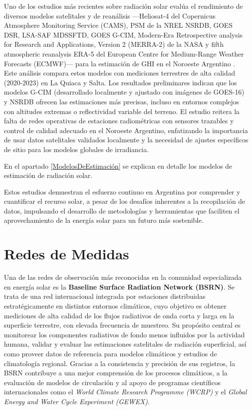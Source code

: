 Uno de los estudios más recientes sobre radiación solar evalúa el rendimiento de diversos modelos satelitales y de reanálisis —Heliosat-4 \citep{qu2017} del Copernicus Atmosphere Monitoring Service (CAMS), PSM de la NREL NSRDB, GOES DSR, LSA-SAF MDSSFTD, GOES G-CIM, Modern-Era Retrospective analysis for Research and Applications, Version 2 (MERRA-2) de la NASA y fifth atmospheric reanalysis ERA-5 del European Centre for Medium-Range Weather Forecasts (ECMWF)— para la estimación de GHI en el Noroeste Argentino \cite{Ledesma2025}. Este análisis compara estos modelos con mediciones terrestres de alta calidad (2020-2023) en La Quiaca y Salta. Los resultados preliminares indican que los modelos G-CIM (desarrollado localmente y ajustado con imágenes de GOES-16) y NSRDB ofrecen las estimaciones más precisas, incluso en entornos complejos con altitudes extremas o reflectividad variable del terreno. El estudio reitera la falta de redes operativas de estaciones radiométricas con sensores trazables y control de calidad adecuado en el Noroeste Argentino, enfatizando la importancia de usar datos satelitales validados localmente y la necesidad de ajustes específicos de sitio para los modelos globales de irradiancia.

En el apartado \ref{ModelosDeEstimación} se explican en detalle los modelos de estimación de radiación solar.

Estos estudios demuestran el esfuerzo continuo en Argentina por comprender y cuantificar el recurso solar, a pesar de los desafíos inherentes a la recopilación de datos, impulsando el desarrollo de metodologías y herramientas que faciliten el aprovechamiento de la energía solar para un futuro más sostenible.

\section{Redes de Medidas}

Una de las redes de observación más reconocidas en la comunidad especializada en energía solar es la \textbf{Baseline Surface Radiation Network (BSRN)}. Se trata de una red internacional integrada por estaciones distribuidas estratégicamente en distintos entornos climáticos, cuyo objetivo es obtener mediciones de alta calidad de los flujos radiativos de onda corta y larga en la superficie terrestre, con elevada frecuencia de muestreo. Su propósito central es monitorear los componentes radiativos de fondo menos influidos por la actividad humana, validar y evaluar las estimaciones satelitales de radiación superficial, así como proveer datos de referencia para modelos climáticos y estudios de climatología regional. Gracias a la consistencia y precisión de sus registros, la BSRN contribuye a una mejor comprensión de los procesos climáticos, a la evaluación de modelos de circulación y al apoyo de programas científicos internacionales como el \textit{World Climate Research Programme (WCRP)} y el \textit{Global Energy and Water Cycle Experiment (GEWEX)}.


